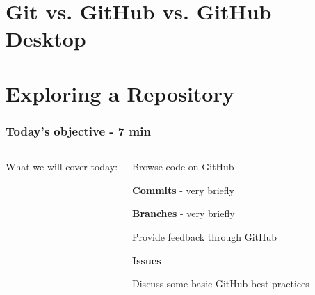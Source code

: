 \documentclass[aspectratio=169]{beamer} %
\begin{document}
\begin{frame}
\begin{columns}[c]
	\end{columns}
\end{frame}

\section{Git vs. GitHub vs. GitHub Desktop}






\section{Exploring a Repository}

\begin{frame}
	\frametitle{Today's objective - 7 min}

	\begin{columns}[c]



		\Large{What we will cover today:}

		\vspace{.5cm}

		\begin{itemize}
			\large{\item Browse code on GitHub}
			\begin{itemize}
				\normalsize{\item \textbf{Commits} - very briefly}
				\normalsize{\item \textbf{Branches} - very briefly}
			\end{itemize}
			\large{\item Provide feedback through GitHub}
			\begin{itemize}
				\normalsize{\item \textbf{Issues}}
			\end{itemize}
			\large{\item Discuss some basic GitHub best practices}
		\end{itemize}


	\end{columns}
\end{frame}
\end{document}
